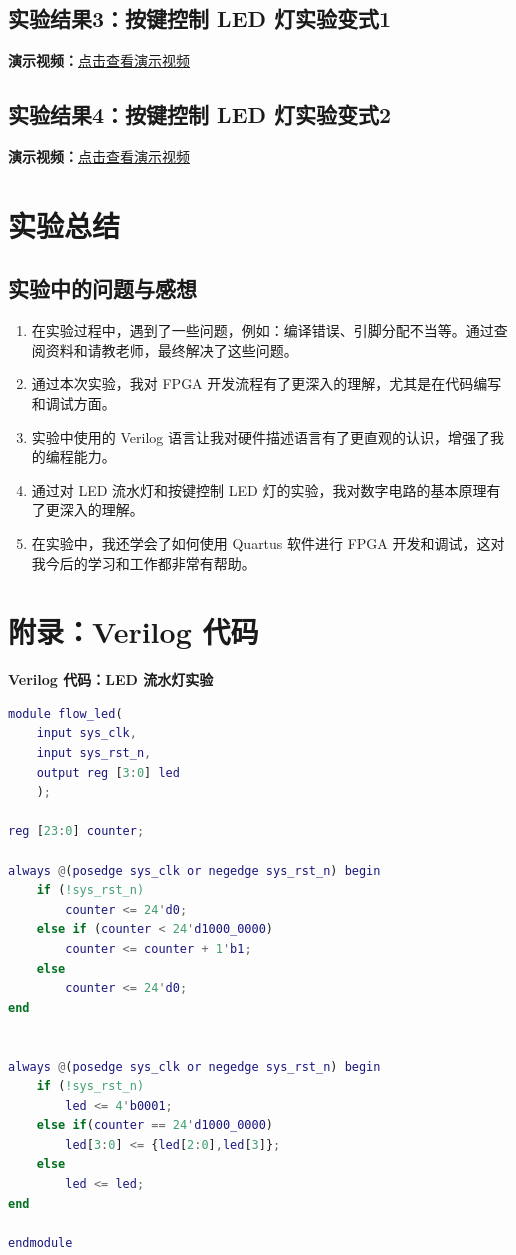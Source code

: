 \documentclass[UTF8]{article}
\theoremstyle{MyLineTheoremStyle} %
\theoremstyle{MyBlockTheoremStyle} %
\theoremstyle{MySubsubsectionStyle} %
\begin{document}
\subsection{实验结果3：按键控制 LED 灯实验变式1}
\noindent
\textbf{演示视频：}\href{https://www.bilibili.com/video/BV1AyVtzPEPV/?share_source=copy_web&vd_source=4fd6c4265e65c0785c912874692a3971}{点击查看演示视频}

\subsection{实验结果4：按键控制 LED 灯实验变式2}
\noindent
\textbf{演示视频：}\href{https://www.bilibili.com/video/BV1wyVtzPE7z/?share_source=copy_web&vd_source=4fd6c4265e65c0785c912874692a3971}{点击查看演示视频}



\section{实验总结}

\subsection{实验中的问题与感想}

\begin{enumerate}
    \item 在实验过程中，遇到了一些问题，例如：编译错误、引脚分配不当等。通过查阅资料和请教老师，最终解决了这些问题。
    \item 通过本次实验，我对 FPGA 开发流程有了更深入的理解，尤其是在代码编写和调试方面。
    \item 实验中使用的 Verilog 语言让我对硬件描述语言有了更直观的认识，增强了我的编程能力。
    \item 通过对 LED 流水灯和按键控制 LED 灯的实验，我对数字电路的基本原理有了更深入的理解。
    \item 在实验中，我还学会了如何使用 Quartus 软件进行 FPGA 开发和调试，这对我今后的学习和工作都非常有帮助。
\end{enumerate}

\cleardoublepage
\section{附录：Verilog 代码}

\textbf{Verilog 代码：LED 流水灯实验}
\begin{lstlisting}[language=Matlab, style=MatlabStyle_src]
module flow_led(
	input sys_clk,
	input sys_rst_n,
	output reg [3:0] led
	);
	
reg [23:0] counter;

always @(posedge sys_clk or negedge sys_rst_n) begin
	if (!sys_rst_n)
		counter <= 24'd0;
	else if (counter < 24'd1000_0000)
		counter <= counter + 1'b1;
	else
		counter <= 24'd0;
end


always @(posedge sys_clk or negedge sys_rst_n) begin
	if (!sys_rst_n)
		led <= 4'b0001;
	else if(counter == 24'd1000_0000)
		led[3:0] <= {led[2:0],led[3]};
	else
		led <= led;
end

endmodule

\end{lstlisting}
\end{document}
